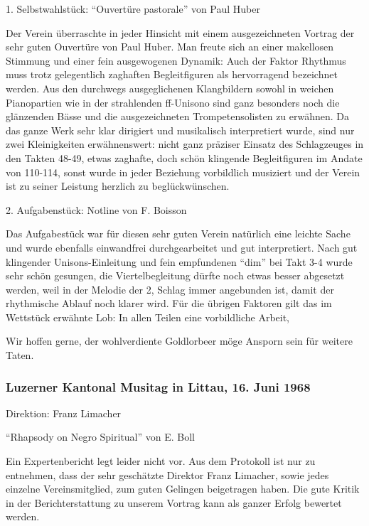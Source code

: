 \begin{history}
    1. Selbstwahlstück: \enquote{Ouvertüre pastorale} von Paul Huber

    Der Verein überraschte in jeder Hinsicht mit einem ausgezeichneten Vortrag
    der sehr guten Ouvertüre von Paul Huber. Man freute sich an einer makellosen
    Stimmung und einer fein ausgewogenen Dynamik: Auch der Faktor Rhythmus muss
    trotz gelegentlich zaghaften Begleitfiguren als hervorragend bezeichnet
    werden. Aus den durchwegs ausgeglichenen Klangbildern sowohl in weichen
    Pianopartien wie in der strahlenden ff-Unisono sind ganz besonders noch die
    glänzenden Bässe und die ausgezeichneten Trompetensolisten zu erwähnen. Da
    das ganze Werk sehr klar dirigiert und musikalisch interpretiert wurde, sind
    nur zwei Kleinigkeiten erwähnenswert: nicht ganz präziser Einsatz des
    Schlagzeuges in den Takten 48-49, etwas zaghafte, doch schön klingende
    Begleitfiguren im Andate von 110-114, sonst wurde in jeder Beziehung
    vorbildlich musiziert und der Verein ist zu seiner Leistung herzlich zu
    beglückwünschen.

    2. Aufgabenstück: Notline von F. Boisson

    Das Aufgabestück war für diesen sehr guten Verein natürlich eine leichte
    Sache und wurde ebenfalls einwandfrei durchgearbeitet und gut interpretiert.
    Nach gut klingender Unisons-Einleitung und fein empfundenen \enquote{dim}
    bei Takt 3-4 wurde sehr schön gesungen, die Viertelbegleitung dürfte noch
    etwas besser abgesetzt werden, weil in der Melodie der 2, Schlag immer
    angebunden ist, damit der rhythmische Ablauf noch klarer wird. Für die
    übrigen Faktoren gilt das im Wettstück erwähnte Lob: In allen Teilen eine
    vorbildliche Arbeit,

    Wir hoffen gerne, der wohlverdiente Goldlorbeer möge Ansporn sein für
    weitere Taten.


    \subsubsection{Luzerner Kantonal Musitag in Littau, 16. Juni 1968}

    Direktion: Franz Limacher

    \enquote{Rhapsody on Negro Spiritual} von E. Boll

    Ein Expertenbericht legt leider nicht vor. Aus dem Protokoll ist nur zu
    entnehmen, dass der sehr geschätzte Direktor Franz Limacher, sowie jedes
    einzelne Vereinsmitglied, zum guten Gelingen beigetragen haben. Die gute
    Kritik in der Berichterstattung zu unserem Vortrag kann als ganzer Erfolg
    bewertet werden.


\end{history}
